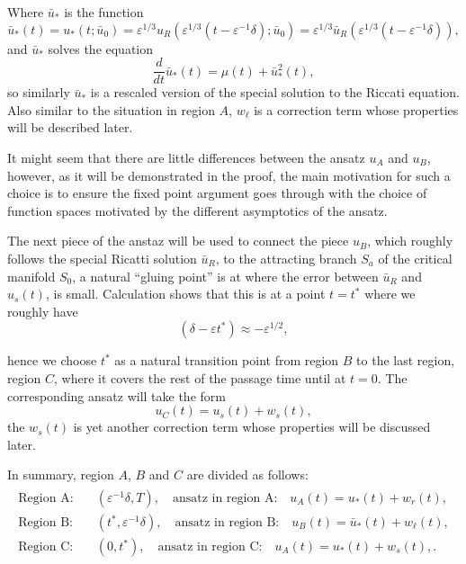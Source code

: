 \documentclass[letterpaper,11pt]{article}
\newcommand{\eps}{\varepsilon}
\numberwithin{equation}{section}
\theoremstyle{plain}
\begin{document}
Where $\bar{u}_*$ is the function
\begin{equation}\label{uldef}
\bar{u}_*(t) = u_*(t;\bar{u}_0) = \eps^{1/3} u_R( \eps^{1/3}(t-\eps^{-1}\delta); \bar{u}_0)=\eps^{1/3}\bar{u}_R(\eps^{1/3}(t-\eps^{-1}\delta)),
\end{equation}
and $\bar{u}_*$ solves the equation
\begin{equation}\label{uleq}
\frac{d}{dt}\bar{u}_* (t) = \mu(t) + \bar{u}_*^2(t),
\end{equation}
so similarly $\bar{u}_*$ is a rescaled version of the special solution to the Riccati equation. Also similar to the situation in region $A$, $w_\ell$ is a correction term whose properties will be described later.

It might seem that there are little differences between the ansatz $u_A$ and $u_B$, however, as it will be demonstrated in the proof, the main  motivation for such a choice is to ensure the fixed point argument goes through with the choice of function spaces motivated by the different asymptotics of the ansatz.

The next piece of the anstaz will be used to connect the piece $u_B$, which roughly follows the special Ricatti solution $\bar{u}_R$, to the attracting branch $S_a$ of the critical manifold $S_0$, a natural ``gluing point'' is at where the error between $\bar{u}_R$ and $u_s(t)$, is small. Calculation shows that this is at a point $t=t^*$ where we roughly have
\begin{equation}
(\delta - \eps t^*) \approx -\eps^{1/2},
\end{equation} 

hence we choose $t^*$ as a natural transition point from region $B$ to the last region, region $C$, where it covers the rest of the passage time until at $t=0$. The corresponding ansatz will take the form
\[
u_C(t) = u_s(t) + w_s(t),
\]
the $w_s(t)$ is yet another correction term whose properties will be discussed later. 

In summary, region $A$, $B$ and $C$ are divided as follows:
\begin{align}\label{region_division_t}
\begin{split}
\text{Region A:} & \quad (\eps^{-1}\delta, T), \quad \text{ansatz in region A:} \quad u_A(t) = u_*(t)+w_r(t), \\
\text{Region B:} & \quad (t^*, \eps^{-1}\delta), \quad \text{ansatz in region B:} \quad u_B(t) = \bar{u}_*(t)+w_\ell(t),  \\
\text{Region C:} & \quad (0, t^*), \quad \text{ansatz in region C:} \quad u_A(t) = u_*(t)+w_s(t), .
\end{split}
\end{align}
\end{document}
